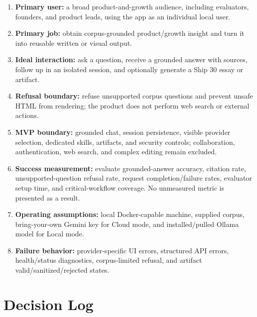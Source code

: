 \documentclass[11pt]{article}
\begin{document}
\begin{enumerate}
  \item \textbf{Primary user:} a broad product-and-growth audience, including evaluators, founders, and product leads, using the app as an individual local user.
  \item \textbf{Primary job:} obtain corpus-grounded product/growth insight and turn it into reusable written or visual output.
  \item \textbf{Ideal interaction:} ask a question, receive a grounded answer with sources, follow up in an isolated session, and optionally generate a Ship 30 essay or artifact.
  \item \textbf{Refusal boundary:} refuse unsupported corpus questions and prevent unsafe HTML from rendering; the product does not perform web search or external actions.
  \item \textbf{MVP boundary:} grounded chat, session persistence, visible provider selection, dedicated skills, artifacts, and security controls; collaboration, authentication, web search, and complex editing remain excluded.
  \item \textbf{Success measurement:} evaluate grounded-answer accuracy, citation rate, unsupported-question refusal rate, request completion/failure rates, evaluator setup time, and critical-workflow coverage. No unmeasured metric is presented as a result.
  \item \textbf{Operating assumptions:} local Docker-capable machine, supplied corpus, bring-your-own Gemini key for Cloud mode, and installed/pulled Ollama model for Local mode.
  \item \textbf{Failure behavior:} provider-specific UI errors, structured API errors, health/status diagnostics, corpus-limited refusal, and artifact valid/sanitized/rejected states.
\end{enumerate}

\section{Decision Log}
\end{document}
